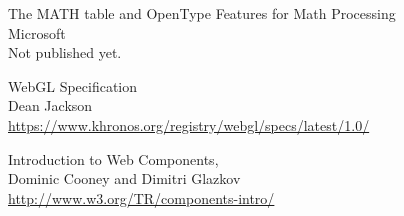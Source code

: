 \begin{thebibliography}{7}
The MATH table and OpenType Features for Math Processing \\
Microsoft \\
Not published yet.

WebGL Specification \\
Dean Jackson \\
\href{https://www.khronos.org/registry/webgl/specs/latest/1.0/}{https://www.khronos.org/registry/webgl/specs/latest/1.0/}

Introduction to Web Components, \\
Dominic Cooney and Dimitri Glazkov \\
\href{http://www.w3.org/TR/components-intro/}{http://www.w3.org/TR/components-intro/}

\end{thebibliography}

